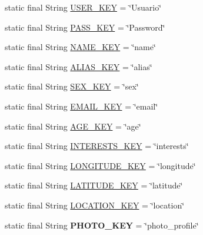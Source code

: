 \begin{DoxyCompactItemize}
\item 
static final String \hyperlink{classcom_1_1example_1_1sebastian_1_1tindertp_1_1commonTools_1_1Common_ab1a1f8a9db6e36312ae326c86361829c}{U\+S\+E\+R\+\_\+\+K\+EY} = \char`\"{}Usuario\char`\"{}
\item 
static final String \hyperlink{classcom_1_1example_1_1sebastian_1_1tindertp_1_1commonTools_1_1Common_adde52a07405e8d140a9f86d733e2e160}{P\+A\+S\+S\+\_\+\+K\+EY} = \char`\"{}Password\char`\"{}
\item 
static final String \hyperlink{classcom_1_1example_1_1sebastian_1_1tindertp_1_1commonTools_1_1Common_a64fbc8f2b601668b5918377d325f26ee}{N\+A\+M\+E\+\_\+\+K\+EY} = \char`\"{}name\char`\"{}
\item 
static final String \hyperlink{classcom_1_1example_1_1sebastian_1_1tindertp_1_1commonTools_1_1Common_a6dfb282dfc359147e031d77f0b409594}{A\+L\+I\+A\+S\+\_\+\+K\+EY} = \char`\"{}alias\char`\"{}
\item 
static final String \hyperlink{classcom_1_1example_1_1sebastian_1_1tindertp_1_1commonTools_1_1Common_a540855ccad31accb2c6a9d8a9071ad59}{S\+E\+X\+\_\+\+K\+EY} = \char`\"{}sex\char`\"{}
\item 
static final String \hyperlink{classcom_1_1example_1_1sebastian_1_1tindertp_1_1commonTools_1_1Common_a1e32ec84b98617bbaf3beb96aefc259c}{E\+M\+A\+I\+L\+\_\+\+K\+EY} = \char`\"{}email\char`\"{}
\item 
static final String \hyperlink{classcom_1_1example_1_1sebastian_1_1tindertp_1_1commonTools_1_1Common_a659946a530f7152a828e547f39259dc6}{A\+G\+E\+\_\+\+K\+EY} = \char`\"{}age\char`\"{}
\item 
static final String \hyperlink{classcom_1_1example_1_1sebastian_1_1tindertp_1_1commonTools_1_1Common_a73b907c50a597827595b340dc0e21d04}{I\+N\+T\+E\+R\+E\+S\+T\+S\+\_\+\+K\+EY} = \char`\"{}interests\char`\"{}
\item 
static final String \hyperlink{classcom_1_1example_1_1sebastian_1_1tindertp_1_1commonTools_1_1Common_aaf0632358f2b089a026fa988b5e17053}{L\+O\+N\+G\+I\+T\+U\+D\+E\+\_\+\+K\+EY} = \char`\"{}longitude\char`\"{}
\item 
static final String \hyperlink{classcom_1_1example_1_1sebastian_1_1tindertp_1_1commonTools_1_1Common_adc92ba88d0f66397f4ef66fbb9c3d7f3}{L\+A\+T\+I\+T\+U\+D\+E\+\_\+\+K\+EY} = \char`\"{}latitude\char`\"{}
\item 
static final String \hyperlink{classcom_1_1example_1_1sebastian_1_1tindertp_1_1commonTools_1_1Common_a173accb141be0b1e5ffcac00660c7af4}{L\+O\+C\+A\+T\+I\+O\+N\+\_\+\+K\+EY} = \char`\"{}location\char`\"{}
\item 
static final String {\bfseries P\+H\+O\+T\+O\+\_\+\+K\+EY} = \char`\"{}photo\+\_\+profile\char`\"{}\hypertarget{classcom_1_1example_1_1sebastian_1_1tindertp_1_1commonTools_1_1Common_a891cb70cf9f108c6c78a7459eff12faa}{}\label{classcom_1_1example_1_1sebastian_1_1tindertp_1_1commonTools_1_1Common_a891cb70cf9f108c6c78a7459eff12faa}


\end{DoxyCompactItemize}

